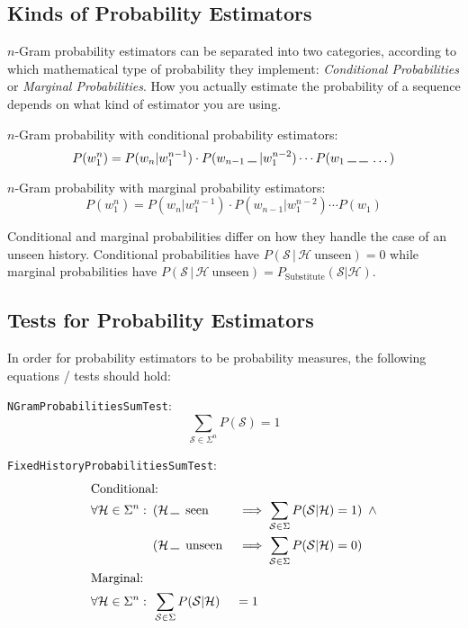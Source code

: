\documentclass[11pt,a4paper]{article}
\newcommand{\Seq}{\mathcal{S}}
\newcommand{\Hist}{\mathcal{H}}
\newcommand{\Skp}{\rule{7pt}{.5pt}}
\begin{document}
  \subsection{Kinds of Probability Estimators}

  $n$-Gram probability estimators can be separated into two categories,
  according to which mathematical type of probability they implement:
  \emph{Conditional Probabilities} or \emph{Marginal Probabilities}. How you
  actually estimate the probability of a sequence depends on what kind of
  estimator you are using.

  $n$-Gram probability with conditional probability estimators:
  \begin{equation}
    P(w_1^n) = P(w_n | w_1^{n-1}) \cdot P(w_{n-1} \: \Skp \: | w_1^{n-2}) \dotsm P(w_1 \: \Skp \: \Skp \: \dotso)
  \end{equation}

  $n$-Gram probability with marginal probability estimators:
  \begin{equation}
    P(w_1^n) = P(w_n | w_1^{n-1}) \cdot P(w_{n-1} | w_1^{n-2}) \dotsm P(w_1)
  \end{equation}

  Conditional and marginal probabilities differ  on how they handle the case of
  an unseen history. Conditional probabilities have
  $P(\Seq \, | \, \Hist \: \mathrm{unseen}) = 0$
  while marginal probabilities have
  $P(\Seq \, | \, \Hist \: \mathrm{unseen}) = P_\mathrm{Substitute}(\Seq | \Hist)$.

  \subsection{Tests for Probability Estimators}

  In order for probability estimators to be probability measures, the
  following equations / tests should hold:

  \texttt{NGramProbabilitiesSumTest}:
  \begin{equation}
    \sum_{\Seq \in \Sigma^n} P(\Seq) = 1
  \end{equation}

  \texttt{FixedHistoryProbabilitiesSumTest}:
  \begin{alignat}{2}
    \intertext{Conditional:}
    \forall \Hist \in \Sigma^n:
    \enspace&(\Hist \, \Skp \enspace \mathrm{seen} &&\implies \sum_{\Seq \in \Sigma} P(\Seq | \Hist) = 1) \enspace \land \\
    \enspace&(\Hist \, \Skp \enspace \mathrm{unseen} &&\implies \sum_{\Seq \in \Sigma} P(\Seq | \Hist) = 0) \notag \\
    \intertext{Marginal:}
    \forall \Hist \in \Sigma^n:
    \enspace&\sum_{\Seq \in \Sigma} P(\Seq | \Hist) &&= 1
  \end{alignat}
\end{document}
